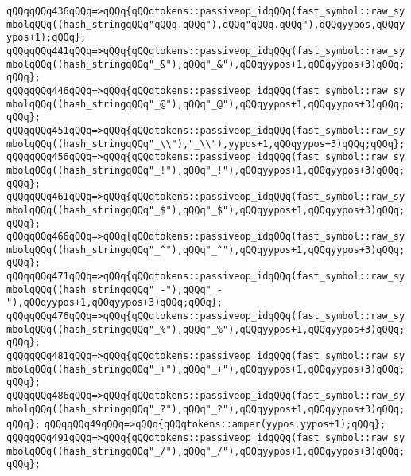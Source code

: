 \verb|qQQqqQQq436qQQq=>qQQq{qQQqtokens::passiveop_idqQQq(fast_symbol::raw_symbolqQQq((hash_stringqQQq"qQQq.qQQq"),qQQq"qQQq.qQQq"),qQQqyypos,qQQqyypos+1);qQQq};|\newline
\verb|qQQqqQQq441qQQq=>qQQq{qQQqtokens::passiveop_idqQQq(fast_symbol::raw_symbolqQQq((hash_stringqQQq"_&"),qQQq"_&"),qQQqyypos+1,qQQqyypos+3)qQQq;qQQq};|\newline
\verb|qQQqqQQq446qQQq=>qQQq{qQQqtokens::passiveop_idqQQq(fast_symbol::raw_symbolqQQq((hash_stringqQQq"_@"),qQQq"_@"),qQQqyypos+1,qQQqyypos+3)qQQq;qQQq};|\newline
\verb|qQQqqQQq451qQQq=>qQQq{qQQqtokens::passiveop_idqQQq(fast_symbol::raw_symbolqQQq((hash_stringqQQq"_\\"),"_\\"),yypos+1,qQQqyypos+3)qQQq;qQQq};|\newline
\verb|qQQqqQQq456qQQq=>qQQq{qQQqtokens::passiveop_idqQQq(fast_symbol::raw_symbolqQQq((hash_stringqQQq"_!"),qQQq"_!"),qQQqyypos+1,qQQqyypos+3)qQQq;qQQq};|\newline
\verb|qQQqqQQq461qQQq=>qQQq{qQQqtokens::passiveop_idqQQq(fast_symbol::raw_symbolqQQq((hash_stringqQQq"_$"),qQQq"_$"),qQQqyypos+1,qQQqyypos+3)qQQq;qQQq};|\newline
\verb|qQQqqQQq466qQQq=>qQQq{qQQqtokens::passiveop_idqQQq(fast_symbol::raw_symbolqQQq((hash_stringqQQq"_^"),qQQq"_^"),qQQqyypos+1,qQQqyypos+3)qQQq;qQQq};|\newline
\verb|qQQqqQQq471qQQq=>qQQq{qQQqtokens::passiveop_idqQQq(fast_symbol::raw_symbolqQQq((hash_stringqQQq"_-"),qQQq"_-"),qQQqyypos+1,qQQqyypos+3)qQQq;qQQq};|\newline
\verb|qQQqqQQq476qQQq=>qQQq{qQQqtokens::passiveop_idqQQq(fast_symbol::raw_symbolqQQq((hash_stringqQQq"_%"),qQQq"_%"),qQQqyypos+1,qQQqyypos+3)qQQq;qQQq};|\newline
\verb|qQQqqQQq481qQQq=>qQQq{qQQqtokens::passiveop_idqQQq(fast_symbol::raw_symbolqQQq((hash_stringqQQq"_+"),qQQq"_+"),qQQqyypos+1,qQQqyypos+3)qQQq;qQQq};|\newline
\verb|qQQqqQQq486qQQq=>qQQq{qQQqtokens::passiveop_idqQQq(fast_symbol::raw_symbolqQQq((hash_stringqQQq"_?"),qQQq"_?"),qQQqyypos+1,qQQqyypos+3)qQQq;qQQq};|\newline
\verb|qQQqqQQq49qQQq=>qQQq{qQQqtokens::amper(yypos,yypos+1);qQQq};|\newline
\verb|qQQqqQQq491qQQq=>qQQq{qQQqtokens::passiveop_idqQQq(fast_symbol::raw_symbolqQQq((hash_stringqQQq"_/"),qQQq"_/"),qQQqyypos+1,qQQqyypos+3)qQQq;qQQq};|\newline
